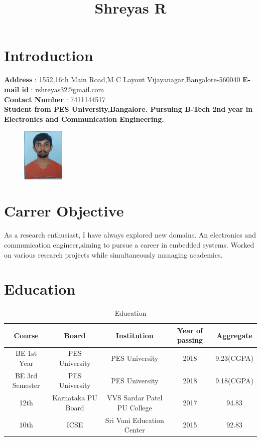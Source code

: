 \documentclass{article}
\title{\textbf{Shreyas R}}
\date{\vspace{-5ex}}
\begin{document}
	\maketitle
	\hrulefill
	
	\section{Introduction}
	\begin{flushleft}
		\textbf{Address} : 1552,16th Main Road,M C Layout
		Vijayanagar,Bangalore-560040
		\textbf{E-mail id} : rshreyas32@gmail.com
		\\\textbf{Contact Number} : 7411144517
		\\\textbf{Student from PES University,Bangalore. Pursuing B-Tech 2nd year in Electronics and Communication Engineering.} 
		\begin{figure}[!ht]
			\begin{flushright}
				\includegraphics[width=20mm]{image.jpeg}
			\end{flushright}
		\end{figure}
	\end{flushleft}

	\section{Carrer Objective}
	As a research enthusiast, I have always explored new domains. An electronics and communication engineer,aiming to pursue a career in embedded systems. Worked on various research projects while simultaneously managing academics.
	
	\section{Education}
	\begin{table}[ht]
		\caption{Education}
		\centering
		\begin{tabular}{c c c c c}
			\hline\hline
			Course & Board & Institution & Year of passing & Aggregate \\[0.5ex]
			\hline
			BE 1st Year & PES University & PES University & 2018 & 9.23(CGPA) \\
			BE 3rd Semester & PES University & PES University & 2018 & 9.18(CGPA) \\
			12th & Karnataka PU Board & VVS Sardar Patel PU College  & 2017 & 94.83 \\
			10th & ICSE & Sri Vani Education Center & 2015 & 92.83 \\ 
			\hline
		\end{tabular}
		\label{table:nonlin}
	\end{table}
\end{document}
